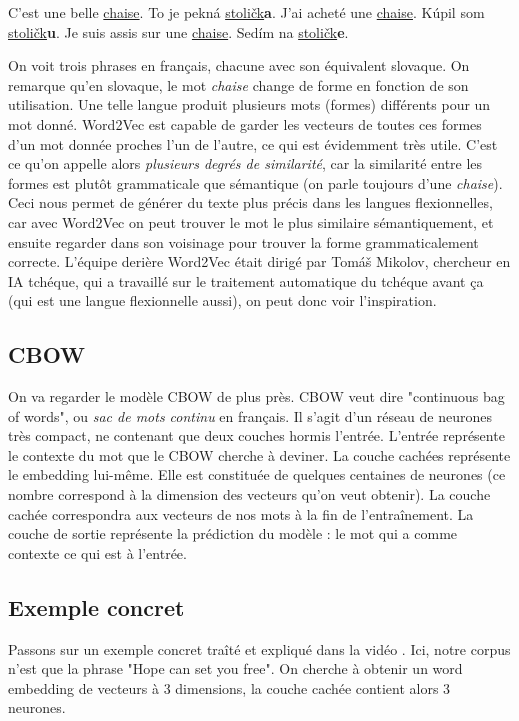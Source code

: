 \documentclass[11pt, a4paper]{report}
\begin{document}
\begin{center}
  C'est une belle \underline{chaise}. To je pekná \underline{stoličk}\textbf{a}. \newline
  J'ai acheté une \underline{chaise}. Kúpil som \underline{stoličk}\textbf{u}. \newline
  Je suis assis sur une \underline{chaise}. Sedím na \underline{stoličk}\textbf{e}. \newline
\end{center}

On voit trois phrases en français, chacune avec son équivalent slovaque. On remarque qu'en 
slovaque, le mot \textit{chaise} change de forme en fonction de son utilisation. Une telle 
langue produit plusieurs mots (formes) différents pour un mot donné. Word2Vec est capable 
de garder les vecteurs de toutes ces formes d'un mot donnée proches l'un de l'autre, 
ce qui est évidemment très utile. C'est ce qu'on appelle alors \textit{plusieurs degrés 
de similarité}, car la similarité entre les formes est plutôt grammaticale que 
sémantique (on parle toujours d'une \textit{chaise}). Ceci nous permet de générer du texte 
plus précis dans les langues flexionnelles, car avec Word2Vec on peut trouver le mot le plus 
similaire sémantiquement, et ensuite regarder dans son voisinage pour trouver la forme 
grammaticalement correcte. L'équipe derière Word2Vec était dirigé par Tomáš Mikolov, 
chercheur en IA tchéque, qui a travaillé sur le traitement automatique du tchéque avant ça
(qui est une langue flexionnelle aussi), on peut donc voir l'inspiration. 

\subsection{CBOW}
On va regarder le modèle CBOW de plus près. CBOW veut dire "continuous bag of words", ou 
\textit{sac de mots continu} en français. Il s'agit d'un réseau de neurones très compact, 
ne contenant que deux couches hormis l'entrée. L'entrée représente le contexte du mot que 
le CBOW cherche à deviner. La couche cachées représente le embedding lui-même. Elle est constituée
de quelques centaines de neurones (ce nombre correspond à la dimension des vecteurs qu'on veut 
obtenir). La couche 
cachée correspondra aux vecteurs de nos mots à la fin de l'entraînement. La couche de sortie 
représente la prédiction du modèle : le mot qui a comme contexte ce qui est à l'entrée. 

\subsection{Exemple concret}
Passons sur un exemple concret traîté et expliqué dans la vidéo 
\cite[\textit{Word2Vec - Skipgram and CBOW}, The Semicolon]{word2vec-semicolon}. 
Ici, notre corpus n'est que la phrase "Hope can set you free". On cherche à obtenir un word 
embedding de vecteurs à 3 dimensions, la couche cachée contient alors 3 neurones.
\end{document}
